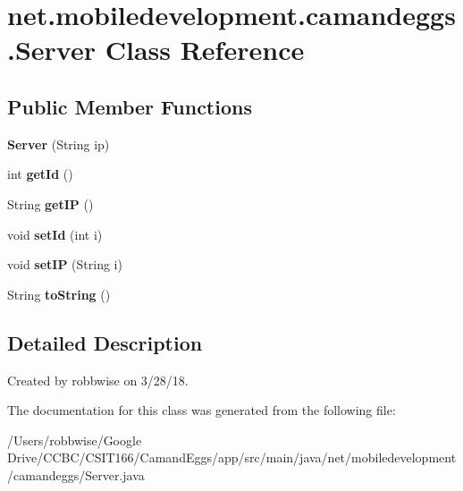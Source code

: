 \hypertarget{classnet_1_1mobiledevelopment_1_1camandeggs_1_1_server}{}\section{net.\+mobiledevelopment.\+camandeggs.\+Server Class Reference}
\label{classnet_1_1mobiledevelopment_1_1camandeggs_1_1_server}
\subsection*{Public Member Functions}
\begin{DoxyCompactItemize}
\item 
\mbox{\label{classnet_1_1mobiledevelopment_1_1camandeggs_1_1_server_a773bd30a67a11c01639d96bf5205a762}} 
{\bfseries Server} (String ip)
\item 
\mbox{\label{classnet_1_1mobiledevelopment_1_1camandeggs_1_1_server_a2c9a1872e2e6ff97b8f4ac9cb34d71f5}} 
int {\bfseries get\+Id} ()
\item 
\mbox{\label{classnet_1_1mobiledevelopment_1_1camandeggs_1_1_server_ac4fc0647dde28db00e875573530b860c}} 
String {\bfseries get\+IP} ()
\item 
\mbox{\label{classnet_1_1mobiledevelopment_1_1camandeggs_1_1_server_a1be30996fde32971d7414df0adf7df1b}} 
void {\bfseries set\+Id} (int i)
\item 
\mbox{\label{classnet_1_1mobiledevelopment_1_1camandeggs_1_1_server_a54a629226e0ed116a93405107d91b8b3}} 
void {\bfseries set\+IP} (String i)
\item 
\mbox{\label{classnet_1_1mobiledevelopment_1_1camandeggs_1_1_server_aa2e205a94f8c7ae112cc50c308cd0000}} 
String {\bfseries to\+String} ()
\end{DoxyCompactItemize}


\subsection{Detailed Description}
Created by robbwise on 3/28/18. 

The documentation for this class was generated from the following file\+:\begin{DoxyCompactItemize}
\item 
/\+Users/robbwise/\+Google Drive/\+C\+C\+B\+C/\+C\+S\+I\+T166/\+Camand\+Eggs/app/src/main/java/net/mobiledevelopment/camandeggs/Server.\+java\end{DoxyCompactItemize}
